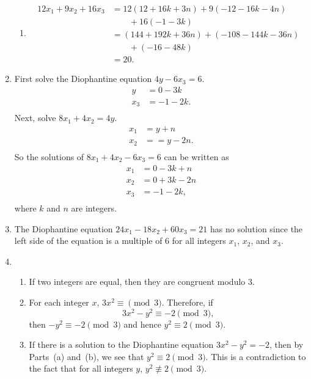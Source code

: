 \begin{enumerate}
\begin{enumerate}
\item \[
\begin{aligned}
12x_1 + 9x_2 + 16x_3 &= 12 \left( 12 + 16k + 3n \right) + 9 \left( -12 -16k - 4n \right) \\
                     &\qquad + 16 \left( -1 - 3k \right) \\
                     &= \left( 144 + 192k + 36n \right) + \left( -108 - 144k - 36 n \right) \\
                     &\qquad + \left( -16 - 48k \right) \\
                     &= 20.
\end{aligned}
\]
\end{enumerate}

\item First solve the Diophantine equation $4y - 6x_3 = 6$.
\[
\begin{aligned}
y &= 0 - 3k \\
x_3 &= -1 - 2k. \\
\end{aligned}
\]
Next, solve $8x_1 + 4x_2 = 4y$.
\[
\begin{aligned}
x_1 &= y + n \\
x_2 &= =y -2n. \\
\end{aligned}
\]
So the solutions of $8x_1 + 4x_2 - 6x_3 = 6$ can be written as
\[
\begin{aligned}
x_1 &= 0 - 3k + n \\
x_2 &= 0 + 3k - 2n \\
x_3 &= -1 - 2k, \\
\end{aligned}
\]
where $k$ and $n$ are integers.

\item The Diophantine equation $24x_1 - 18x_2 + 60x_3 = 21$ has no solution since the left side of the equation is a multiple of 6 for all integers $x_1$, $x_2$, and $x_3$.

\item \begin{enumerate}
\item If two integers are equal, then they are congruent modulo 3.

\item For each integer $x$, $3x^2 \equiv \pmod 3$.  Therefore, if 
\[
3x^2 - y^2 \equiv -2 \pmod 3, 
\]
then $-y^2 \equiv -2 \pmod 3$ and hence $y^2 \equiv 2 \pmod 3$.

\item If there is a solution to the Diophantine equation $3x^2 - y^2 = -2$, then by Parts~(a) and~(b), we see that $y^2 \equiv 2 \pmod 3$.  This is a contradiction to the fact that for all integers $y$, $y^2 \not \equiv 2 \pmod 3$.
\end{enumerate}


\end{enumerate}
